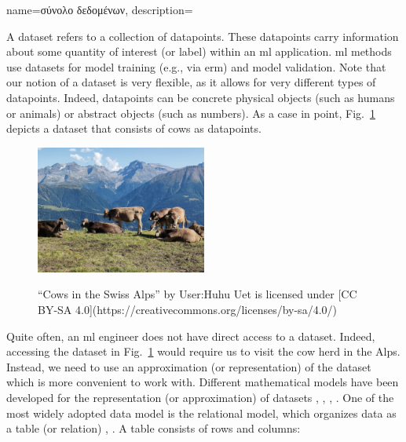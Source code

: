 {name={\foreignlanguage{greek}{σύνολο δεδομένων}},
	description={A dataset refers to a collection of \gls{datapoint}s. These 
		\gls{datapoint}s carry information about some quantity of interest (or \gls{label}) within 
		an \gls{ml} application. \gls{ml} methods use datasets for \gls{model} training (e.g., via \gls{erm})
		and \gls{model} \gls{validation}. Note that our notion of a dataset is very flexible, as 
		it allows for very different types of \gls{datapoint}s. Indeed, \gls{datapoint}s can be concrete 
		physical objects (such as humans or animals) or abstract objects (such as numbers). 
		As a case in point, Fig.\ \ref{fig_cows_dataset} depicts a dataset that consists of cows as 
		\gls{datapoint}s. 
		\begin{figure}[H]
				\begin{center}
		\label{fig:cowsintheswissalps}
		\includegraphics[width=0.5\textwidth]{assets/Cows_in_the_Swiss_Alps}
		  \end{center}
		\caption{\label{fig_cows_dataset}“Cows in the Swiss Alps” by User:Huhu Uet is licensed under [CC BY-SA 4.0](https://creativecommons.org/licenses/by-sa/4.0/)}
	  \end{figure}
       Quite often, an \gls{ml} engineer does not have direct access to a dataset. Indeed, accessing the 
       dataset in Fig.\ \ref{fig_cows_dataset} would require us to visit the cow herd in the Alps. Instead, 
       we need to use an approximation (or representation) of the dataset which is more convenient 
       to work with. Different mathematical \gls{model}s have been developed for the representation (or approximation) 
       of datasets \cite{silberschatz2019database}, \cite{abiteboul1995foundations}, \cite{hoberman2009data}, \cite{ramakrishnan2002database}. 
       One of the most widely adopted data \gls{model} is the relational \gls{model}, which organizes \gls{data} 
       as a table (or relation) \cite{codd1970relational}, \cite{silberschatz2019database}.
		A table consists of rows and columns:
}}
